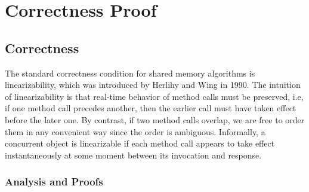 %

\chapter{Correctness Proof}
\section{Correctness}
The standard correctness condition for shared memory algorithms is linearizability, which was introduced by Herlihy and Wing in 1990. The intuition of linearizability is that real-time behavior of method calls must be preserved, i.e, if one method call precedes another, then the earlier call must have taken effect before the later one. By contrast, if two method calls overlap, we are free to order them in any convenient way since the order is ambiguous. Informally, a concurrent object is linearizable if each method call appears to take effect instantaneously at some moment between its invocation and response.

\subsection{Analysis and Proofs}

